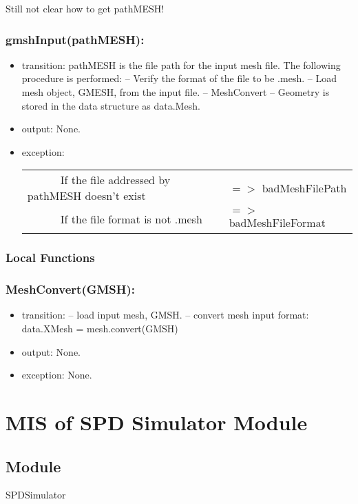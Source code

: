 \documentclass[12pt, titlepage]{article}
\begin{document}
Still not clear how to get pathMESH!

\subsubsection*{gmshInput(pathMESH):}
\begin{itemize}
	\item transition: pathMESH is the file path for the input mesh file. The following procedure is performed:
	\subitem -- Verify the format of the file to be .mesh.
	\subitem -- Load mesh object, GMESH, from the input file. 
	\subitem -- MeshConvert
	\subitem -- Geometry is stored in the data structure as data.Mesh.
	
	\item output: None.
	\item exception: 
		\noindent \begin{longtable*}[l]{l l}
		\ \ \ \ \ \ If the file addressed by pathMESH doesn't exist & $=>$ badMeshFilePath\\
		\ \ \ \ \ \ If the file format is not .mesh & $=>$ badMeshFileFormat\\
	\end{longtable*}
	 
\end{itemize}


\subsubsection{Local Functions}

\subsubsection*{MeshConvert(GMSH):}
\begin{itemize}
	\item transition: 
	\subitem -- load input mesh, GMSH.
	\subitem -- convert mesh input format:
	\subsubitem data.XMesh = mesh.convert(GMSH) 
	\item output: None. 
	\item exception: None.
\end{itemize}

\newpage
%
%
%
%
\section{MIS of SPD Simulator Module} \label{SSM} 

\subsection{Module}
SPDSimulator
\end{document}
